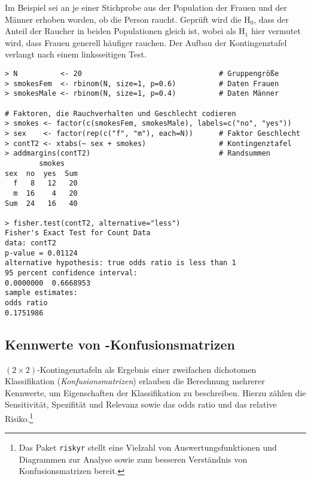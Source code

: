 Im Beispiel sei an je einer Stichprobe aus der Population der Frauen und der Männer erhoben worden, ob die Person raucht. Geprüft wird die $\text{H}_{0}$, dass der Anteil der Raucher in beiden Populationen gleich ist, wobei als $\text{H}_{1}$ hier vermutet wird, dass Frauen generell häufiger rauchen. Der Aufbau der Kontingenztafel verlangt nach einem linksseitigen Test.
\begin{lstlisting}
> N          <- 20                                # Gruppengröße
> smokesFem  <- rbinom(N, size=1, p=0.6)          # Daten Frauen
> smokesMale <- rbinom(N, size=1, p=0.4)          # Daten Männer

# Faktoren, die Rauchverhalten und Geschlecht codieren
> smokes <- factor(c(smokesFem, smokesMale), labels=c("no", "yes"))
> sex    <- factor(rep(c("f", "m"), each=N))      # Faktor Geschlecht
> contT2 <- xtabs(~ sex + smokes)                 # Kontingenztafel
> addmargins(contT2)                              # Randsummen
        smokes
sex  no  yes  Sum
  f   8   12   20
  m  16    4   20
Sum  24   16   40

> fisher.test(contT2, alternative="less")
Fisher's Exact Test for Count Data
data: contT2
p-value = 0.01124
alternative hypothesis: true odds ratio is less than 1
95 percent confidence interval:
0.0000000  0.6668953
sample estimates:
odds ratio
0.1751986
\end{lstlisting}

\subsection[Kennwerte von \texorpdfstring{$(2 \times 2)$}{(2x2)}-Konfusionsmatrizen]{Kennwerte von -Konfusionsmatrizen}
\label{sec:confMat}

$(2 \times 2)$-Kontingenztafeln als Ergebnis einer zweifachen dichotomen Klassifikation (\emph{Konfusionsmatrizen}) erlauben die Berechnung mehrerer Kennwerte, um Eigenschaften der Klassifikation zu beschreiben. Hierzu zählen die Sensitivität, Spezifität und Relevanz sowie das odds ratio und das relative Risiko.\footnote{Das Paket \lstinline!riskyr! \cite{Neth2019} stellt eine Vielzahl von Auswertungsfunktionen und Diagrammen zur Analyse sowie zum besseren Verständnis von Konfusionsmatrizen bereit.}

